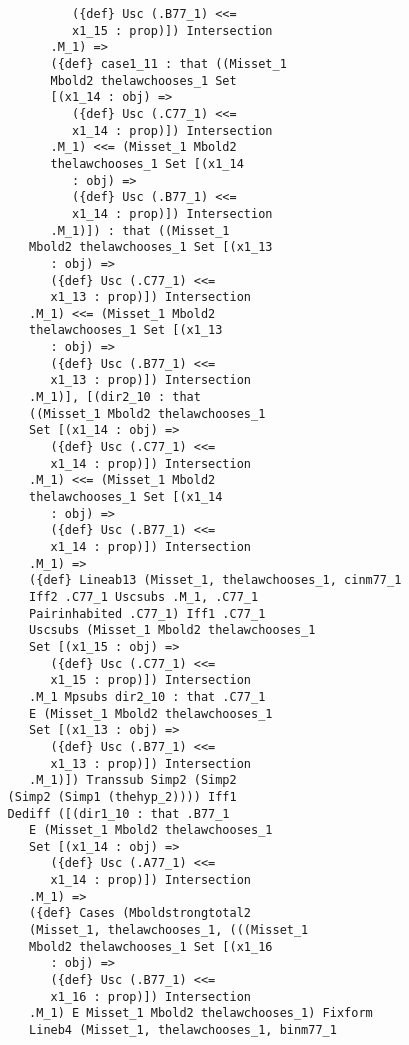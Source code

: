 \documentclass[12pt]{article}
\begin{document}
\begin{verbatim}
                   ({def} Usc (.B77_1) <<= 
                   x1_15 : prop)]) Intersection 
                .M_1) => 
                ({def} case1_11 : that ((Misset_1 
                Mbold2 thelawchooses_1 Set 
                [(x1_14 : obj) => 
                   ({def} Usc (.C77_1) <<= 
                   x1_14 : prop)]) Intersection 
                .M_1) <<= (Misset_1 Mbold2 
                thelawchooses_1 Set [(x1_14 
                   : obj) => 
                   ({def} Usc (.B77_1) <<= 
                   x1_14 : prop)]) Intersection 
                .M_1)]) : that ((Misset_1 
             Mbold2 thelawchooses_1 Set [(x1_13 
                : obj) => 
                ({def} Usc (.C77_1) <<= 
                x1_13 : prop)]) Intersection 
             .M_1) <<= (Misset_1 Mbold2 
             thelawchooses_1 Set [(x1_13 
                : obj) => 
                ({def} Usc (.B77_1) <<= 
                x1_13 : prop)]) Intersection 
             .M_1)], [(dir2_10 : that 
             ((Misset_1 Mbold2 thelawchooses_1 
             Set [(x1_14 : obj) => 
                ({def} Usc (.C77_1) <<= 
                x1_14 : prop)]) Intersection 
             .M_1) <<= (Misset_1 Mbold2 
             thelawchooses_1 Set [(x1_14 
                : obj) => 
                ({def} Usc (.B77_1) <<= 
                x1_14 : prop)]) Intersection 
             .M_1) => 
             ({def} Lineab13 (Misset_1, thelawchooses_1, cinm77_1 
             Iff2 .C77_1 Uscsubs .M_1, .C77_1 
             Pairinhabited .C77_1) Iff1 .C77_1 
             Uscsubs (Misset_1 Mbold2 thelawchooses_1 
             Set [(x1_15 : obj) => 
                ({def} Usc (.C77_1) <<= 
                x1_15 : prop)]) Intersection 
             .M_1 Mpsubs dir2_10 : that .C77_1 
             E (Misset_1 Mbold2 thelawchooses_1 
             Set [(x1_13 : obj) => 
                ({def} Usc (.B77_1) <<= 
                x1_13 : prop)]) Intersection 
             .M_1)]) Transsub Simp2 (Simp2 
          (Simp2 (Simp1 (thehyp_2)))) Iff1 
          Dediff ([(dir1_10 : that .B77_1 
             E (Misset_1 Mbold2 thelawchooses_1 
             Set [(x1_14 : obj) => 
                ({def} Usc (.A77_1) <<= 
                x1_14 : prop)]) Intersection 
             .M_1) => 
             ({def} Cases (Mboldstrongtotal2 
             (Misset_1, thelawchooses_1, (((Misset_1 
             Mbold2 thelawchooses_1 Set [(x1_16 
                : obj) => 
                ({def} Usc (.B77_1) <<= 
                x1_16 : prop)]) Intersection 
             .M_1) E Misset_1 Mbold2 thelawchooses_1) Fixform 
             Lineb4 (Misset_1, thelawchooses_1, binm77_1 

\end{verbatim}
\end{document}
